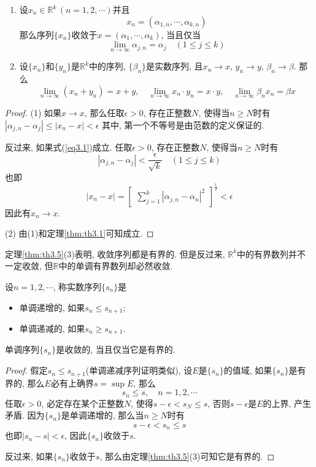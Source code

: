 \documentclass[cn,12pt,math=mtpro2,citestyle=gb7714-2015,bibstyle=gb7714-2015,twocol]{elegantbook}
\newcommand{\R}{\mathbb{R}}
\newcommand{\bx}{x}
\newcommand{\limn}{\lim_{n\to\infty}}
\newcommand{\y}{y}
\begin{document}
\begin{theorem}
  \begin{enumerate}[label=(\arabic*)]
  \item 设$\bx_n\in\R^k\,(n=1,2,\cdots)$并且
  $$\bx_n=(\alpha_{1,n},\cdots,\alpha_{k,n})$$
  那么序列$\{x_n\}$收敛于$\bx=(\alpha_1,\cdots,\alpha_k)$, 当且仅当
  \begin{equation}\label{eq3.1}
  \limn \alpha_{j,n}=\alpha_j\quad(1\leq j\leq k)
  \end{equation}

  \item 设$\{\bx_n\}$和$\{\y _n\}$是$\R^k$中的序列, $\{\beta_n\}$是实数序列, 且$\bx_n\rightarrow \bx$, $\y _n\rightarrow\y $, $\beta_n\rightarrow\beta$. 那么
  $$\limn (\bx_n+\y _n)=\bx+\y ,\quad \limn \bx_n\cdot\y _n=\bx\cdot\y ,\quad\limn \beta_n\bx_n=\beta\bx$$
  \end{enumerate}
\end{theorem}
\begin{proof}
   (1) 如果$\bx\rightarrow\bx$, 那么任取$\epsilon>0$, 存在正整数$N$, 使得当$n\geq N$时有
  $|\alpha_{j,n}-\alpha_j|\leq|\bx_n-\bx|<\epsilon$
  其中, 第一个不等号是由范数的定义保证的.

  反过来, 如果式(\ref{eq3.1})成立. 任取$\epsilon>0$, 存在正整数$N$, 使得当$n\geq N$时有
  $$|\alpha_{j,n}-\alpha_j|<\frac{\epsilon}{\sqrt{k}}\quad (1\leq j\leq k)$$
  也即
  $$|\bx_n-\bx|=\begin{bmatrix}
                      \displaystyle\sum_{j=1}^{k}|\alpha_{j,n}-\alpha_n|^2
                    \end{bmatrix}^{\frac{1}{2}}<\epsilon
  $$
  因此有$\bx_n\rightarrow\bx$.

  (2) 由(1)和定理\ref{thm:th3.1}可知成立.
\end{proof}
定理\ref{thm:th3.5}(3)表明, 收敛序列都是有界的. 但是反过来, $\R^k$中的有界数列并不一定收敛, 但$\R$中的单调有界数列却必然收敛.
\begin{definition}
设$n=1,2,\cdots$, 称实数序列$\{s_n\}$是
\begin{itemize}
\item 单调递增的, 如果$s_n\leq s_{n+1}$;

\item 单调递减的, 如果$s_n\geq s_{n+1}$.
\end{itemize}
\end{definition}
\begin{theorem}[单调有界收敛定理]\label{thm:th3.6}
  单调序列$\{s_n\}$是收敛的, 当且仅当它是有界的.
\end{theorem}
\begin{proof}
  假定$s_n\leq s_{n+1}$(单调递减序列证明类似), 设$E$是$\{s_n\}$的值域, 如果$\{s_n\}$是有界的, 那么$E$必有上确界$s=\sup E$, 那么
  $$s_n\leq s,\quad n=1,2,\cdots$$
  任取$\epsilon>0$, 必定存在某个正整数$N$, 使得$s-\epsilon<s_N\leq s$, 否则$s-\epsilon$是$E$的上界, 产生矛盾. 因为$\{s_n\}$是单调递增的, 那么当$n\geq N$时有
  $$s-\epsilon<s_n\leq s$$
  也即$|s_n-s|<\epsilon$, 因此$\{s_n\}$收敛于$s$.

  反过来, 如果$\{s_n\}$收敛于$s$, 那么由定理\ref{thm:th3.5}(3)可知它是有界的.

\end{proof}
\end{document}
